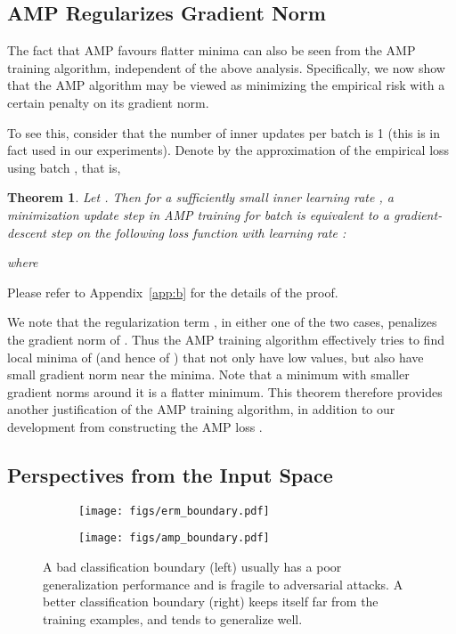 \documentclass[final]{cvpr}
\newtheorem{theorem}{Theorem}
\begin{document}
\subsection{AMP Regularizes Gradient Norm}

The fact that AMP favours flatter minima can also be seen from the AMP training algorithm, independent of the above analysis. Specifically, we now show that the AMP algorithm may be viewed as minimizing the empirical risk with a certain penalty on its gradient norm.

To see this, consider that the number  of inner updates per batch is 1 (this is in fact used in our experiments). Denote by  the approximation of the empirical loss  using batch , that is, 


\begin{theorem}\label{thm2}
Let . Then for a sufficiently small inner learning rate , a minimization update step in AMP training for batch  is equivalent to a gradient-descent step on the following loss function with learning rate :

where

\end{theorem}
Please refer to Appendix~\ref{app:b} for the details of the proof.

We note that the regularization term , in either one of the two cases, penalizes the gradient norm of . Thus the AMP training algorithm effectively tries to find local minima of  (and hence of ) that not only have low values, but also have small gradient norm near the minima. Note that a minimum with smaller gradient norms around it is a flatter minimum. This theorem therefore provides another justification of the AMP training algorithm, in addition to our development from constructing the AMP loss .

\subsection{Perspectives from the Input Space}

\begin{figure}[t]
\centering
\begin{subfigure}{0.45\columnwidth}\centering \texttt{[image: figs/erm\_boundary.pdf]}\end{subfigure}\begin{subfigure}{0.45\columnwidth}\centering \texttt{[image: figs/amp\_boundary.pdf]}\end{subfigure}\caption{A bad classification boundary (left) usually has a poor generalization performance and is fragile to adversarial attacks. A better classification boundary (right) keeps itself far from the training examples, and tends to generalize well.}
\label{fig:boundary}
\end{figure}
\end{document}

